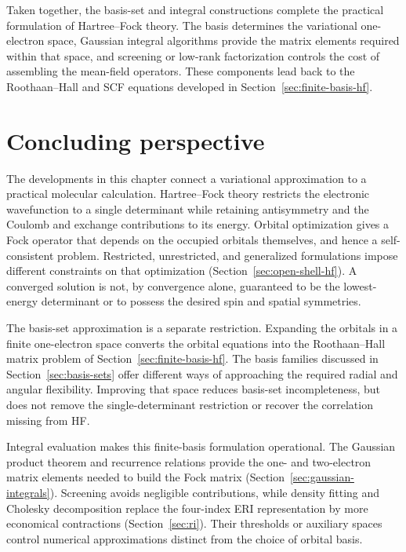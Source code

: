 \documentclass[11pt,a4paper,titlepage]{article}
\numberwithin{equation}{section}
\begin{document}
Taken together, the basis-set and integral constructions complete the
practical formulation of Hartree--Fock theory. The basis determines the
variational one-electron space, Gaussian integral algorithms provide the
matrix elements required within that space, and screening or low-rank
factorization controls the cost of assembling the mean-field operators. These
components lead back to the Roothaan--Hall and SCF equations developed in
Section~\ref{sec:finite-basis-hf}.



\section{Concluding perspective}
\label{sec:conclusion}

The developments in this chapter connect a variational approximation to a
practical molecular calculation. Hartree--Fock theory restricts the
electronic wavefunction to a single determinant while retaining
antisymmetry and the Coulomb and exchange contributions to its energy.
Orbital optimization gives a Fock operator that depends on the occupied
orbitals themselves, and hence a self-consistent problem. Restricted,
unrestricted, and generalized formulations impose different constraints on
that optimization (Section~\ref{sec:open-shell-hf}). A converged solution is
not, by convergence alone, guaranteed to be the lowest-energy determinant
or to possess the desired spin and spatial symmetries.

The basis-set approximation is a separate restriction. Expanding the
orbitals in a finite one-electron space converts the orbital equations into
the Roothaan--Hall matrix problem of Section~\ref{sec:finite-basis-hf}.
The basis families discussed in Section~\ref{sec:basis-sets} offer different
ways of approaching the required radial and angular flexibility. Improving
that space reduces basis-set incompleteness, but does not remove the
single-determinant restriction or recover the correlation missing from HF.

Integral evaluation makes this finite-basis formulation operational. The
Gaussian product theorem and recurrence relations provide the one- and
two-electron matrix elements needed to build the Fock matrix
(Section~\ref{sec:gaussian-integrals}). Screening avoids negligible
contributions, while density fitting and Cholesky decomposition replace the
four-index ERI representation by more economical contractions
(Section~\ref{sec:ri}). Their thresholds or auxiliary spaces control
numerical approximations distinct from the choice of orbital basis.
\end{document}
